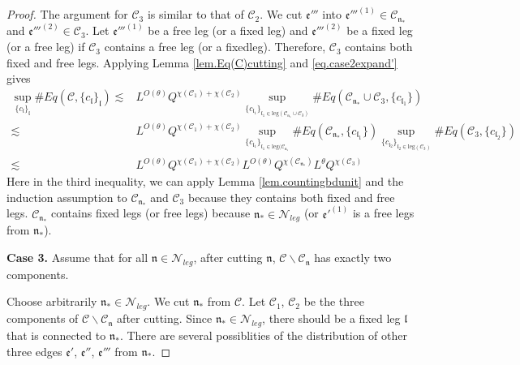 \begin{proof}
The argument for $\mathcal{C}_3$ is similar to that of $\mathcal{C}_2$. We cut $\mathfrak{e}'''$ into $\mathfrak{e}'''^{(1)}\in  \mathcal{C}_{\mathfrak{n}_*}$ and $\mathfrak{e}'''^{(2)}\in  \mathcal{C}_3$. Let $\mathfrak{e}'''^{(1)}$ be a free leg (or a fixed leg) and $\mathfrak{e}'''^{(2)}$ be a fixed leg (or a free leg) if $\mathcal{C}_3$ contains a free leg (or a fixedleg). Therefore, $\mathcal{C}_3$ contains both fixed and free legs. Applying Lemma \ref{lem.Eq(C)cutting} and \eqref{eq.case2expand'} gives
\begin{equation}
\begin{split}
    \sup_{\{c_{\mathfrak{l}}\}_{\mathfrak{l}}}\#Eq(\mathcal{C},\{c_{\mathfrak{l}}\}_{\mathfrak{l}})
    \lesssim& L^{O(\theta)} Q^{\chi(\mathcal{C}_1)+\chi(\mathcal{C}_2)}\sup_{\{c_{\mathfrak{l}_1}\}_{\mathfrak{l}_1\in \text{leg}(\mathcal{C}_{\mathfrak{n}_*}\cup \mathcal{C}_3)} } \# Eq(\mathcal{C}_{\mathfrak{n}_*}\cup \mathcal{C}_3,\{c_{\mathfrak{l}_1}\}) 
    \\
    \lesssim&  L^{O(\theta)} Q^{\chi(\mathcal{C}_1)+\chi(\mathcal{C}_2)}\sup_{\{c_{\mathfrak{l}_1}\}_{\mathfrak{l}_1\in \text{leg}(\mathcal{C}_{\mathfrak{n}_*}} } \# Eq(\mathcal{C}_{\mathfrak{n}_*},\{c_{\mathfrak{l}_1}\}) \sup_{\{c_{\mathfrak{l}_2}\}_{\mathfrak{l}_2\in \text{leg}(\mathcal{C}_3)} }\# Eq(\mathcal{C}_{3}, \{c_{\mathfrak{l}_2}\})
    \\
    \lesssim& L^{O(\theta)} Q^{\chi(\mathcal{C}_1)+\chi(\mathcal{C}_2)} L^{O(\theta)} Q^{\chi(\mathcal{C}_{\mathfrak{n}_*})} L^\theta Q^{\chi(\mathcal{C}_3)} 
\end{split}
\end{equation}
Here in the third inequality, we can apply Lemma \ref{lem.countingbdunit} and the induction assumption to $\mathcal{C}_{\mathfrak{n}_*}$ and $\mathcal{C}_3$ because they contains both fixed and free legs. $\mathcal{C}_{\mathfrak{n}_*}$ contains fixed legs (or free legs) because $\mathfrak{n}_*\in\mathcal{N}_{leg}$ (or $\mathfrak{e}'^{(1)}$ is a free legs from $\mathfrak{n}_*$).

\textbf{Case 3.} Assume that for all $\mathfrak{n}\in \mathcal{N}_{leg}$, after cutting $\mathfrak{n}$, $\mathcal{C}\backslash \mathcal{C}_{\mathfrak{n}}$ has exactly two components.

Choose arbitrarily $\mathfrak{n}_*\in \mathcal{N}_{leg}$. We cut $\mathfrak{n}_*$ from $\mathcal{C}$. Let $\mathcal{C}_1$, $\mathcal{C}_2$ be the three components of $\mathcal{C}\backslash \mathcal{C}_{\mathfrak{n}}$ after cutting. Since $\mathfrak{n}_*\in \mathcal{N}_{leg}$, there should be a fixed leg $\mathfrak{l}$ that is connected to $\mathfrak{n}_*$. There are several possiblities of the distribution of other three edges $\mathfrak{e}'$, $\mathfrak{e}''$, $\mathfrak{e}'''$ from $\mathfrak{n}_*$.  


\end{proof}
